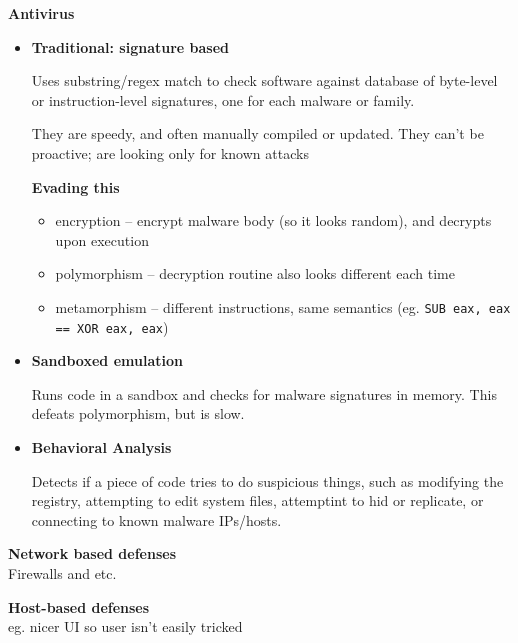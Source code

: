 \textbf{Antivirus}
\begin{itemize}
	\item \textbf{Traditional: signature based}

	Uses substring/regex match to check software against database of byte-level or instruction-level signatures, one for each malware or family.

	They are speedy, and often manually compiled or updated. They can't be proactive; are looking only for known attacks

	\textbf{Evading this}
	\begin{itemize}
		\item encryption -- encrypt malware body (so it looks random), and decrypts upon execution
		\item polymorphism -- decryption routine also looks different each time
		\item metamorphism -- different instructions, same semantics (eg. \texttt{SUB eax, eax == XOR eax, eax})
	\end{itemize}
	
	\item \textbf{Sandboxed emulation}

	Runs code in a sandbox and checks for malware signatures in memory. This defeats polymorphism, but is slow.

	\item \textbf{Behavioral Analysis}

	Detects if a piece of code tries to do suspicious things, such as modifying the registry, attempting to edit system files, attemptint to hid or replicate, or connecting to known malware IPs/hosts.
\end{itemize}

\textbf{Network based defenses} \\ 
Firewalls and etc. 

\textbf{Host-based defenses}\\
eg. nicer UI so user isn't easily tricked



